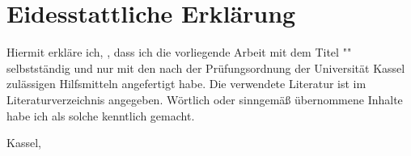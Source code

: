 \chapter*{Eidesstattliche Erklärung}


Hiermit erkläre ich, \thesisauthorname, dass ich die vorliegende Arbeit mit dem Titel "\thesistitle" selbstständig 
und nur mit den nach der Prüfungsordnung der Universität Kassel zulässigen Hilfsmitteln angefertigt habe.
Die verwendete Literatur ist im Literaturverzeichnis angegeben.
Wörtlich oder sinngemäß übernommene Inhalte habe ich als solche kenntlich gemacht.

\vspace{1cm}

Kassel, \thesisdate

\begin{flushright}
  \underline{\hspace{7cm}} \\
  \thesisauthorname
\end{flushright}
